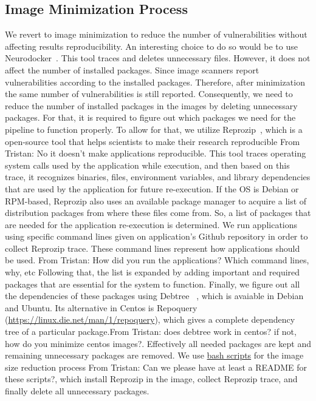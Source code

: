 \documentclass[a4paper,num-refs]{oup-contemporary}
\newcommand{\tristan}[1]{\color{blue}From Tristan: #1\color{black}}
\begin{document}
\subsection{Image Minimization Process}
We revert to image minimization to reduce the number of vulnerabilities without affecting results reproducibility.
An interesting choice to do so would be to use 
Neurodocker~\cite{neurodocker}.
This tool traces and deletes unnecessary files.
However, it does not affect the number of installed packages.
Since image scanners report vulnerabilities according to the installed
packages. Therefore, after
minimization the same number of vulnerabilities is still reported.
Consequently, we need to reduce the number of installed packages
in the images by deleting unnecessary packages. For that, it is required to figure
out which packages we need for the pipeline to function properly. To allow for that, we utilize
Reprozip~\cite{rampin2016reprozip}, which is a open-source tool that
helps scientists to make their research reproducible \tristan{No it doesn't make applications reproducible}. This tool traces operating system calls used by the
application while execution, and then based on this trace, it recognizes binaries, files, environment variables,
and library dependencies that are used by the application for future re-execution. If the OS is
Debian or RPM-based, Reprozip also
uses an available package manager to acquire a list of distribution packages from where these files come from.
So, a list of packages that are needed for the application re-execution is determined. We run applications
using specific command lines given on application's Github repository in order to collect Reprozip trace.
These command lines represent how applications should be used.
\tristan{How did you run the applications? Which command lines, why, etc} Following that, the list
is expanded by adding important and required packages that are essential
for the system to function. Finally, we figure out all the dependencies of these packages using Debtree
~\cite{debtree}, which is avaiable in Debian and Ubuntu. Its alternative in Centos is Repoquery (\url{https://linux.die.net/man/1/repoquery}), which
gives a complete dependency tree of a particular package.\tristan{does debtree work in centos? if not, how do you minimize centos images?}.
Effectively all needed packages are kept and remaining unnecessary packages are removed. We use
\href{https://github.com/kaurbhupinder/Vulnerability-Analysis/tree/master/Scripts/minification}{bash scripts} for
the image size reduction process \tristan{Can we please have at least a README for these scripts?}, which install Reprozip in the image, collect Reprozip trace, and
finally delete all unnecessary packages.
\end{document}
